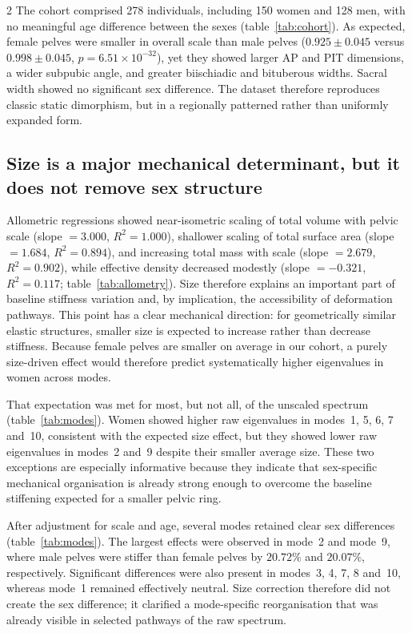 \documentclass[openacc]{rsproca_new}
\begin{document}
\begin{multicols}{2}
The cohort comprised 278 individuals, including 150 women and 128 men, with no meaningful age difference between the sexes (table~\ref{tab:cohort}). As expected, female pelves were smaller in overall scale than male pelves ($0.925 \pm 0.045$ versus $0.998 \pm 0.045$, $p=6.51 \times 10^{-32}$), yet they showed larger AP and PIT dimensions, a wider subpubic angle, and greater biischiadic and bituberous widths. Sacral width showed no significant sex difference. The dataset therefore reproduces classic static dimorphism, but in a regionally patterned rather than uniformly expanded form.

\subsection{Size is a major mechanical determinant, but it does not remove sex structure}

Allometric regressions showed near-isometric scaling of total volume with pelvic scale (slope $=3.000$, $R^2=1.000$), shallower scaling of total surface area (slope $=1.684$, $R^2=0.894$), and increasing total mass with scale (slope $=2.679$, $R^2=0.902$), while effective density decreased modestly (slope $=-0.321$, $R^2=0.117$; table~\ref{tab:allometry}). Size therefore explains an important part of baseline stiffness variation and, by implication, the accessibility of deformation pathways. This point has a clear mechanical direction: for geometrically similar elastic structures, smaller size is expected to increase rather than decrease stiffness. Because female pelves are smaller on average in our cohort, a purely size-driven effect would therefore predict systematically higher eigenvalues in women across modes.

That expectation was met for most, but not all, of the unscaled spectrum (table~\ref{tab:modes}). Women showed higher raw eigenvalues in modes~1, 5, 6, 7 and~10, consistent with the expected size effect, but they showed lower raw eigenvalues in modes~2 and~9 despite their smaller average size. These two exceptions are especially informative because they indicate that sex-specific mechanical organisation is already strong enough to overcome the baseline stiffening expected for a smaller pelvic ring.

After adjustment for scale and age, several modes retained clear sex differences (table~\ref{tab:modes}). The largest effects were observed in mode~2 and mode~9, where male pelves were stiffer than female pelves by $20.72\%$ and $20.07\%$, respectively. Significant differences were also present in modes~3, 4, 7, 8 and~10, whereas mode~1 remained effectively neutral. Size correction therefore did not create the sex difference; it clarified a mode-specific reorganisation that was already visible in selected pathways of the raw spectrum.


\end{multicols}
\end{document}
